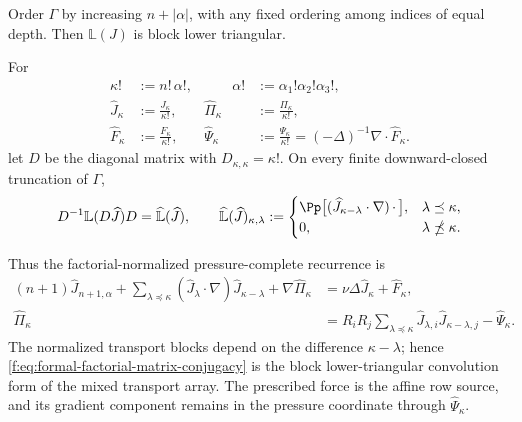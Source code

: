 \begin{proposition}
Order \(\Gamma\) by increasing \(n+|\alpha|\), with any fixed ordering among
indices of equal depth.  Then \(\mathbb L(J)\) is block lower triangular.
\begin{samepage}
For
\[
 \begin{aligned}
 \kappa!&:=n!\,\alpha!,
 &\qquad \alpha!&:=\alpha_1!\alpha_2!\alpha_3!,\\
 \widehat J_\kappa&:=\frac{J_\kappa}{\kappa!},
 &\widehat\Pi_\kappa&:=\frac{\Pi_\kappa}{\kappa!},\\
 \widehat F_\kappa&:=\frac{F_\kappa}{\kappa!},
 &\widehat\Psi_\kappa&:=\frac{\Psi_\kappa}{\kappa!}
 =(-\Delta)^{-1}\nabla\cdot\widehat F_\kappa.
 \end{aligned}
\]
let \(D\) be the diagonal matrix with \(D_{\kappa,\kappa}=\kappa!\).  On
every finite downward-closed truncation of \(\Gamma\),
\begin{equation}
 D^{-1}\mathbb L(D\widehat J)D
 =\widehat{\mathbb L}(\widehat J),
 \qquad
 \widehat{\mathbb L}(\widehat J)_{\kappa,\lambda}
 :=
 \begin{cases}
 \Pp\bigl[(\widehat J_{\kappa-\lambda}\cdot\nabla)
            \,\mathord\cdot\,\bigr],
 &\lambda\preceq\kappa,\\
 0,&\lambda\npreceq\kappa.
 \end{cases}
 \label{f:eq:formal-factorial-matrix-conjugacy}
\end{equation}
\end{samepage}
Thus the factorial-normalized pressure-complete recurrence is
\begin{align}
 (n+1)\widehat J_{n+1,\alpha}
 +\sum_{\lambda\preceq\kappa}
   (\widehat J_\lambda\cdot\nabla)
   \widehat J_{\kappa-\lambda}
 +\nabla\widehat\Pi_\kappa
 &=\nu\Delta\widehat J_\kappa+\widehat F_\kappa,
 \label{f:eq:formal-factorial-velocity-convolution}\\
 \widehat\Pi_\kappa
 &=R_iR_j\sum_{\lambda\preceq\kappa}
   \widehat J_{\lambda,i}\widehat J_{\kappa-\lambda,j}
   -\widehat\Psi_\kappa.
 \label{f:eq:formal-factorial-pressure-convolution}
\end{align}
The normalized transport blocks depend on the difference
\(\kappa-\lambda\); hence \eqref{f:eq:formal-factorial-matrix-conjugacy} is the
block lower-triangular convolution form of the mixed transport array.  The
prescribed force is the affine row source, and its gradient component remains
in the pressure coordinate through \(\widehat\Psi_\kappa\).
\end{proposition}

